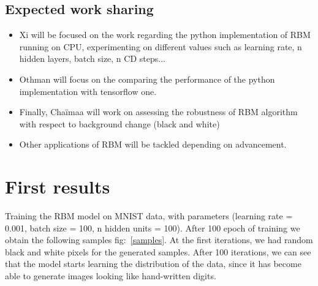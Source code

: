 \documentclass[a4paper,10pt]{article}
\begin{document}
\subsection{Expected work sharing}

\begin{itemize}
    \setlength{\itemsep}{3pt}
    \setlength{\parskip}{0pt}
    \item Xi will be focused on the work regarding the python implementation of RBM running on CPU, experimenting on different values such as learning rate, n hidden layers, batch size, n CD steps...
	\item Othman will focus on the comparing the performance of the python implementation with tensorflow one. 
	\item Finally, Chaïmaa will work on assessing the robustness of RBM algorithm with respect to background change (black and white)
	\item Other applications of RBM will be tackled depending on advancement. 
\end{itemize}

\section{First results}

Training the RBM model on MNIST data, with parameters (learning rate = 0.001, batch size = 100, n hidden units = 100). After 100 epoch of training we obtain the following samples fig:~\ref{samples}. At the first iterations, we had random black and white pixels for the generated samples. After 100 iterations, we can see that the model starts learning the distribution of the data, since it has become able to generate images looking like hand-written digits.
\end{document}

